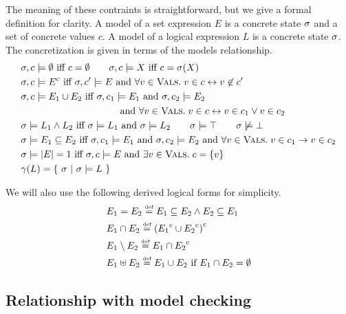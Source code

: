 The meaning of these contraints is straightforward, but we give a formal definition for clarity.  A model of a set expression $E$ is a concrete state $\sigma$ and a set of concrete values $c$.  A model of a logical expression $L$ is a concrete state $\sigma$.  The concretization is given in terms of the models relationship.
\begin{align*}
  & \sigma, c \models \emptyset \textrm{ iff } c = \emptyset \qquad \sigma, c \models X \textrm{ iff } c = \sigma(X) \\
  & \sigma, c \models {E}^{\mathrm{c}} \textrm{ iff } \sigma, c' \models{E} \textrm{ and } \forall v \in \textsc{Vals}. \; v \in c \leftrightarrow v \not\in c' \\
  & \sigma, c \models E_1 \cup E_2 \textrm{ iff } \sigma, c_1 \models E_1 \textrm{ and } \sigma, c_2 \models E_2\\
  & \qquad \qquad \qquad \qquad \qquad  \textrm{ and } \forall v \in \textsc{Vals}. \; v \in c \leftrightarrow v \in c_1 \vee v \in c_2 \\
  & \sigma \models L_1 \wedge L_2 \textrm{ iff } \sigma \models L_1 \textrm{ and } \sigma \models L_2 \qquad \sigma \models \top \qquad \sigma \not\models \bot \\
  & \sigma \models E_1 \subseteq E_2 \textrm{ iff } \sigma, c_1 \models E_1 \textrm{ and } \sigma, c_2 \models E_2 \textrm{ and } \forall v \in \textsc{Vals}. \; v \in c_1 \rightarrow v \in c_2 \\
  & \sigma \models |{E}| = 1 \textrm{ iff } \sigma, c \models E \textrm{ and } \exists v \in \textsc{Vals}. \; c = \{v\} \\
  & \gamma(L) = \{\ \sigma \ |\  \sigma \models L\ \}
\end{align*}

We will also use the following derived logical forms for simplicity.
\begin{align*}
 & E_1 = E_2 \stackrel{\textrm{\tiny def}}{=} E_1 \subseteq E_2 \wedge E_2 \subseteq E_1 \\
 & E_1 \cap E_2 \stackrel{\textrm{\tiny def}}{=} {({E_1}^{\mathrm{c}} \cup {E_2}^{\mathrm{c}})}^{\mathrm{c}} \\
 & E_1 \setminus E_2 \stackrel{\textrm{\tiny def}}{=} E_1 \cap {E_2}^{\mathrm{c}} \\
 & E_1 \uplus E_2 \stackrel{\textrm{\tiny def}}{=} E_1 \cup E_2 \textrm{ if } E_1 \cap E_2 = \emptyset
\end{align*}

\subsection{Relationship with model checking}

